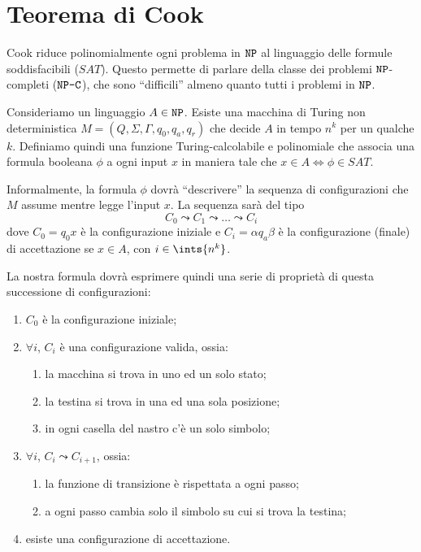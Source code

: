 
\section{Teorema di Cook}

Cook riduce polinomialmente ogni problema in $\texttt{NP}$ al linguaggio delle formule soddisfacibili ($SAT$).
Questo permette di parlare della classe dei problemi $\texttt{NP}$-completi ($\texttt{NP-C}$), che sono ``difficili'' almeno quanto tutti i problemi in $\texttt{NP}$.

Consideriamo un linguaggio $A \in \texttt{NP}$.
Esiste una macchina di Turing non deterministica $M = ( Q, \Sigma, \Gamma, q_0, q_a, q_r )$ che decide $A$ in tempo $n^k$ per un qualche $k$.
Definiamo quindi una funzione Turing-calcolabile e polinomiale che associa una formula booleana $\phi$ a ogni input $x$ in maniera tale che $x \in A \iff \phi \in SAT$.

Informalmente, la formula $\phi$ dovr\`a ``descrivere'' la sequenza di configurazioni che $M$ assume mentre legge l'input $x$.
La sequenza sar\`a del tipo
\[
	C_0 \leadsto C_1 \leadsto \dots \leadsto C_i
\]
dove $C_0 = q_0 x$ \`e la configurazione iniziale e $C_i = \alpha q_a \beta$ \`e la configurazione (finale) di accettazione se $x \in A$, con $i \in \ints{n^k}$.

La nostra formula dovr\`a esprimere quindi una serie di propriet\`a di questa successione di configurazioni:
\begin{enumerate}
	\item\label{itm:cook_conf_in} $C_0$ \`e la configurazione iniziale;
	\item\label{itm:cook_conf_val} $\forall i$, $C_i$ \`e una configurazione valida, ossia:
		\begin{enumerate}
			\item\label{itm:cook_conf_val_stato} la macchina si trova in uno ed un solo stato;
			\item\label{itm:cook_conf_val_posiz} la testina si trova in una ed una sola posizione;
			\item\label{itm:cook_conf_val_simb} in ogni casella del nastro c'\`e un solo simbolo;
		\end{enumerate}
	\item\label{itm:cook_conf_trans} $\forall i$, $C_i \leadsto C_{i+1}$, ossia:
		\begin{enumerate}
			\item\label{itm:conf_trans_val} la funzione di transizione \`e rispettata a ogni passo;
			\item\label{itm:conf_trans_simb} a ogni passo cambia solo il simbolo su cui si trova la testina;
		\end{enumerate}
	\item\label{itm:conf_acc} esiste una configurazione di accettazione.
\end{enumerate}

